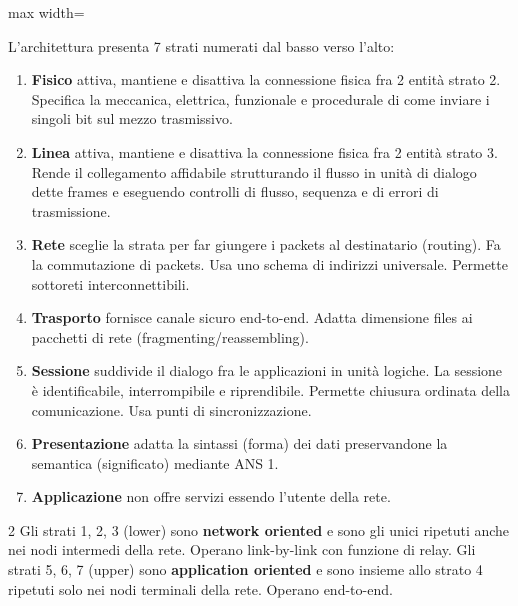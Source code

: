 \begin{center}
\begin{adjustbox}{max width=\textwidth}
	\end{adjustbox}
\end{center}
L'architettura presenta 7 strati numerati dal basso verso l'alto:
\begin{enumerate}
	\item \textbf{Fisico} attiva, mantiene e disattiva la connessione fisica fra 2 entità strato 2. Specifica la meccanica, elettrica, funzionale e procedurale di come inviare i singoli bit sul mezzo trasmissivo.
	\item \textbf{Linea} attiva, mantiene e disattiva la connessione fisica fra 2 entità strato 3. Rende il collegamento affidabile strutturando il flusso in unità di dialogo dette frames e eseguendo controlli di flusso, sequenza e di errori di trasmissione.
	\item \textbf{Rete} sceglie la strata per far giungere i packets al destinatario (routing). Fa la commutazione di packets. Usa uno schema di indirizzi universale. Permette sottoreti interconnettibili.
	\item \textbf{Trasporto} fornisce canale sicuro end-to-end. Adatta dimensione files ai pacchetti di rete (fragmenting/reassembling).
	\item \textbf{Sessione} suddivide il dialogo fra le applicazioni in unità logiche. La sessione è identificabile, interrompibile e riprendibile. Permette chiusura ordinata della comunicazione. Usa punti di sincronizzazione.
	\item \textbf{Presentazione} adatta la sintassi (forma) dei dati preservandone la semantica (significato) mediante ANS 1.
	\item \textbf{Applicazione} non offre servizi essendo l'utente della rete.
\end{enumerate}
\begin{paracol}{2}
	\noindent Gli strati 1, 2, 3 (lower) sono \textbf{network oriented} e sono gli unici ripetuti anche nei nodi intermedi della rete.
	Operano link-by-link con funzione di relay.
	\switchcolumn
	\noindent Gli strati 5, 6, 7 (upper) sono \textbf{application oriented} e sono insieme allo strato 4 ripetuti solo nei nodi terminali della rete.
	Operano end-to-end.
\end{paracol}
